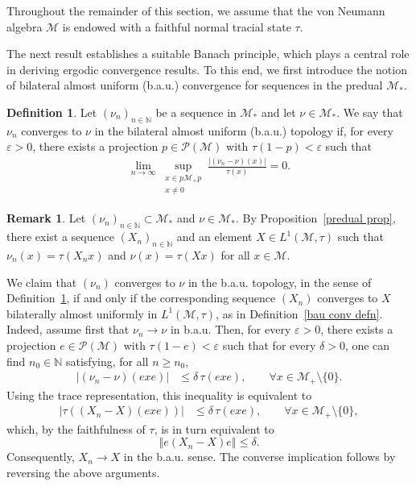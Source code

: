 \documentclass[11pt]{amsart}
\theoremstyle{definition}
\newtheorem{defn}[thm]{Definition}
\theoremstyle{myremark}
\newtheorem{rem}[thm]{Remark}
\numberwithin{equation}{section}
\def\N{\mathbb N}
\newcommand{\CM}{\mathcal{M}}
\newcommand{\CP}{\mathcal{P}}
\newcommand{\abs}[1]{\left\vert#1\right\vert}
\newcommand{\norm}[1]{\left\Vert#1\right\Vert}
\begin{document}
\noindent Throughout the remainder of this section, we assume that the von Neumann algebra $\CM$ is endowed with a faithful normal tracial state $\tau$.

\noindent The next result establishes a suitable Banach principle, which plays a central role in deriving ergodic convergence results. To this end, we first introduce the notion of bilateral almost uniform (b.a.u.) convergence for sequences in the predual $\CM_*$.

\begin{defn}\label{bau conv- functionals}
	Let $(\nu_n)_{n \in \N}$ be a sequence in $\CM_*$ and let $\nu \in \CM_*$. We say that $\nu_n$ converges to $\nu$ in the bilateral almost uniform (b.a.u.) topology if, for every $\varepsilon > 0$, there exists a projection $p \in \CP(\CM)$ with $\tau(1-p) < \varepsilon$ such that
	\begin{align*}
		\lim_{n \to \infty} 
		\sup_{\substack{x \in p\CM_+p \\ x \neq 0}}
		\frac{\abs{(\nu_n - \nu)(x)}}{\tau(x)} = 0 .
	\end{align*}
\end{defn}

\begin{rem}\label{equiv of bau convg}
	Let $(\nu_n)_{n \in \N} \subset \CM_*$ and $\nu \in \CM_*$. By Proposition~\ref{predual prop}, there exist a sequence $(X_n)_{n \in \N}$ and an element $X \in L^1(\CM,\tau)$ such that $\nu_n(x) = \tau(X_n x)$ and $\nu(x) = \tau(Xx)$ for all $x \in \CM$.

	We claim that $(\nu_n)$ converges to $\nu$ in the b.a.u. topology, in the sense of Definition~\ref{bau conv- functionals}, if and only if the corresponding sequence $(X_n)$ converges to $X$ bilaterally almost uniformly in $L^1(\CM,\tau)$, as in Definition~\ref{bau conv defn}. Indeed, assume first that $\nu_n \to \nu$ in b.a.u. Then, for every $\varepsilon > 0$, there exists a projection $e \in \CP(\CM)$ with $\tau(1-e) < \varepsilon$ such that for every $\delta > 0$, one can find $n_0 \in \N$ satisfying, for all $n \geq n_0$,
	\begin{align*}
		\abs{(\nu_n - \nu)(exe)} 
		&\leq \delta \, \tau(exe), \qquad \forall x \in \CM_+ \setminus \{0\}.
	\end{align*}
	Using the trace representation, this inequality is equivalent to
	\begin{align*}
		\abs{\tau\!\left((X_n - X)(exe)\right)}
		&\leq \delta \, \tau(exe), \qquad \forall x \in \CM_+ \setminus \{0\},
	\end{align*}
	which, by the faithfulness of $\tau$, is in turn equivalent to
	\[
		\norm{e(X_n - X)e} \leq \delta .
	\]
	Consequently, $X_n \to X$ in the b.a.u. sense. The converse implication follows by reversing the above arguments.
\end{rem}
\end{document}
